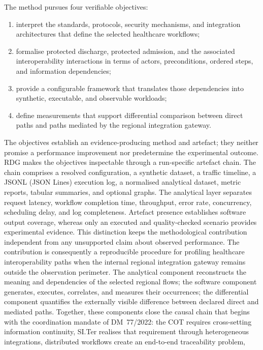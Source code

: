 The method pursues four verifiable objectives:
\begin{enumerate}
    \item interpret the standards, protocols, security mechanisms, and
    integration architectures that define the selected healthcare workflows;
    \item formalise protected discharge, protected admission, and the associated
    interoperability interactions in terms of actors, preconditions, ordered
    steps, and information dependencies;
    \item provide a configurable framework that translates those dependencies
    into synthetic, executable, and observable workloads;
    \item define measurements that support differential comparison between
    direct paths and paths mediated by the regional integration gateway.
\end{enumerate}
\noindent The objectives establish an evidence-producing method and artefact; they neither
promise a performance improvement nor predetermine the experimental outcome. RDG makes the objectives inspectable through a run-specific artefact chain. The
chain comprises a resolved configuration, a synthetic dataset, a traffic
timeline, a JSONL (JSON Lines) execution log, a normalised analytical dataset,
metric reports, tabular summaries, and optional graphs. The analytical layer
separates request latency, workflow completion time, throughput, error rate,
concurrency, scheduling delay, and log completeness. Artefact presence
establishes software output coverage, whereas only an executed and
quality-checked scenario provides experimental evidence. This distinction keeps
the methodological contribution independent from any unsupported claim about
observed performance. The contribution is consequently a reproducible procedure for profiling
healthcare interoperability paths when the internal regional integration gateway remains outside the
observation perimeter. The analytical component reconstructs the meaning and
dependencies of the selected regional flows; the software component generates,
executes, correlates, and measures their occurrences; the differential component
quantifies the externally visible difference between declared direct and
mediated paths. Together, these components close the causal chain that begins
with the coordination mandate of DM~77/2022: the COT requires cross-setting
information continuity, SI.Ter realises that requirement through heterogeneous
integrations, distributed workflows create an end-to-end traceability problem,
